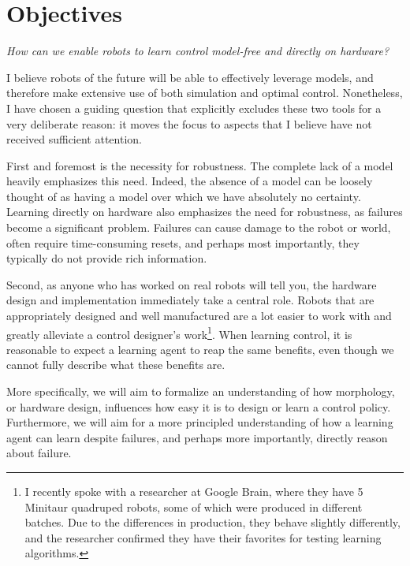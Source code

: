 \section{Objectives}
\emph{How can we enable robots to learn control model-free and directly on hardware?} \par
I believe robots of the future will be able to effectively leverage models, and therefore make extensive use of both simulation and optimal control.
Nonetheless, I have chosen a guiding question that explicitly excludes these two tools for a very deliberate reason: it moves the focus to aspects that I believe have not received sufficient attention. \par
First and foremost is the necessity for robustness. The complete lack of a model heavily emphasizes this need. Indeed, the absence of a model can be loosely thought of as having a model over which we have absolutely no certainty.
Learning directly on hardware also emphasizes the need for robustness, as failures become a significant problem. Failures can cause damage to the robot or world, often require time-consuming resets, and perhaps most importantly, they typically do not provide rich information. \par
Second, as anyone who has worked on real robots will tell you, the hardware design and implementation immediately take a central role. Robots that are appropriately designed and well manufactured are a lot easier to work with and greatly alleviate a control designer's work\footnote{I recently spoke with a researcher at Google Brain, where they have 5 Minitaur quadruped robots, some of which were produced in different batches. Due to the differences in production, they behave slightly differently, and the researcher confirmed they have their favorites for testing learning algorithms.}. When learning control, it is reasonable to expect a learning agent to reap the same benefits, even though we cannot fully describe what these benefits are. \par

More specifically, we will aim to formalize an understanding of how morphology, or hardware design, influences how easy it is to design or learn a control policy. Furthermore, we will aim for a more principled understanding of how a learning agent can learn despite failures, and perhaps more importantly, directly reason about failure.


